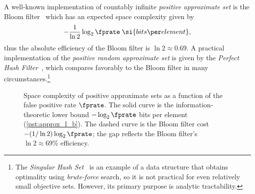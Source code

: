 A well-known implementation of countably infinite \emph{positive approximate set} is the Bloom filter~\cite{bf} which has an expected space complexity given
by
\begin{equation}
    -\frac{1}{\ln 2} \log_2 \fprate \; \si{bits \per element},
\end{equation}
thus the absolute efficiency of the Bloom filter is $\ln 2 \approx 0.69$.
A practical implementation of the \emph{positive random approximate set} is given by the \emph{Perfect Hash Filter}~\cite{phf}, which compares favorably to the Bloom filter in many circumstances.\footnote{The \emph{Singular Hash Set}~\cite{shs} is an example of a data structure that obtains optimality using \emph{brute-force} search, so it is not practical for even relatively small objective sets. However, its primary purpose is analytic tractability.}

\begin{figure}[ht]
\centering
{}
\caption{Space complexity of positive approximate sets as a function of
the false positive rate $\fprate$.
The solid curve is the information-theoretic lower bound
$-\log_2 \fprate$ bits per element (\cref{pst:approx_l_b}).
The dashed curve is the Bloom filter cost
$-(1/\ln 2)\log_2 \fprate$; the gap reflects the Bloom filter's
$\ln 2 \approx 69\%$ efficiency.}
\label{fig:space_lower_bound}
\end{figure}
